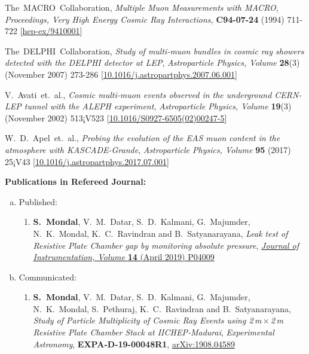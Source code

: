 \documentclass[a4paper,12pt,twoside]{article}
\begin{document}
\begin{thebibliography}{9}
  The~MACRO~Collaboration, \emph{Multiple Muon Measurements with MACRO}, \emph{Proceedings, Very High Energy Cosmic Ray Interactions,} \textbf{C94-07-24} (1994) 711-722 [\href{https://arxiv.org/abs/hep-ex/9410001}{hep-ex/9410001}]

  The~DELPHI~Collaboration, \emph{Study of multi-muon bundles in cosmic ray showers detected with the DELPHI detector at LEP}, \emph{Astroparticle Physics, Volume }\textbf{28}(3) (November 2007) 273-286 [\href{https://doi.org/10.1016/j.astropartphys.2007.06.001}{10.1016/j.astropartphys.2007.06.001}]

  V.~Avati~et.~al., \emph{Cosmic multi-muon events observed in the underground CERN-LEP tunnel with the ALEPH experiment}, \emph{Astroparticle Physics, Volume }\textbf{19}(3) (November 2002) 513¡V523 [\href{https://doi.org/10.1016/S0927-6505(02)00247-5}{10.1016/S0927-6505(02)00247-5}]

  W.~D.~Apel~et.~al., \emph{Probing the evolution of the EAS muon content in the atmosphere with KASCADE-Grande}, \emph{Astroparticle Physics, Volume }\textbf{95} (2017) 25¡V43 [\href{https://doi.org/10.1016/j.astropartphys.2017.07.001}{10.1016/j.astropartphys.2017.07.001}]

\end{thebibliography}





\newpage

\noindent\textbf{Publications in Refereed Journal:}
\begin{enumerate}[a.]
\item Published:
  \begin{enumerate}[1)]
  \item \textbf{S.~Mondal}, V.~M.~Datar, S.~D.~Kalmani, G.~Majumder, N.~K.~Mondal, K.~C.~Ravindran and B.~Satyanarayana, \emph{Leak test of Resistive Plate Chamber gap by monitoring absolute pressure}, \href{https://doi.org/10.1088/1748-0221/14/04/P04009}{\emph{Journal of Instrumentation, Volume } \textbf{14} (April 2019) P04009}
  \end{enumerate}
\item Communicated:
  \begin{enumerate}[1)]
  \item \textbf{S.~Mondal}, V.~M.~Datar, S.~D.~Kalmani, G.~Majumder, N.~K.~Mondal, S.~Pethuraj, K.~C.~Ravindran and B.~Satyanarayana, \emph{Study of Particle Multiplicity of Cosmic Ray Events using 2\,m\,$\times$\,2\,m Resistive Plate Chamber Stack at IICHEP-Madurai}, \emph{Experimental Astronomy}, \textbf{EXPA-D-19-00048R1}, \href{https://arxiv.org/abs/1908.04589}{arXiv:1908.04589}
  \end{enumerate}
\end{enumerate}
\end{document}

